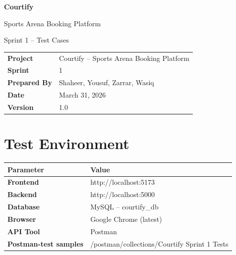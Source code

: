 \documentclass[12pt,a4paper]{article}
\begin{document}

\begin{titlepage}
\centering
\vspace*{2cm}
{\Huge\bfseries\color{sectionblue} Courtify}\par
\vspace{0.4cm}
{\Large Sports Arena Booking Platform}\par
\vspace{1.5cm}
{\huge Sprint 1 -- Test Cases}\par
\vspace{2cm}
\renewcommand{\arraystretch}{1.5}
\begin{tabular}{ll}
\textbf{Project}     & Courtify -- Sports Arena Booking Platform \\
\textbf{Sprint}      & 1 \\
\textbf{Prepared By} & Shaheer, Yousuf, Zarrar, Wasiq \\
\textbf{Date}        & March 31, 2026 \\
\textbf{Version}     & 1.0 \\
\end{tabular}
\end{titlepage}


\section{Test Environment}

\renewcommand{\arraystretch}{1.4}
\begin{tabularx}{\textwidth}{|>{\bfseries}p{3.5cm}|X|}
\hline
\rowcolor{headerbg}\color{white}Parameter & \color{white}Value \\ \hline
Frontend               & http://localhost:5173 \\ \hline
\rowcolor{rowgray}
Backend                & http://localhost:5000 \\ \hline
Database               & MySQL -- courtify\_db \\ \hline
\rowcolor{rowgray}
Browser                & Google Chrome (latest) \\ \hline
API Tool               & Postman \\ \hline
\rowcolor{rowgray}
Postman-test samples   & /postman/collections/Courtify Sprint 1 Tests \\ \hline
\end{tabularx}
\end{document}
